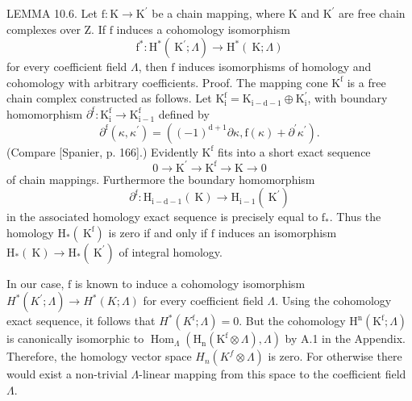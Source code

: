 \documentclass[10pt]{article}
\begin{document}
LEMMA 10.6. Let $\mathrm{f}: \mathrm{K} \rightarrow \mathrm{K}^{\prime}$ be a chain mapping, where $\mathrm{K}$ and $\mathrm{K}^{\prime}$ are free chain complexes over Z. If $\mathrm{f}$ induces a cohomology isomorphism
$$
\mathrm{f}^{*}: \mathrm{H}^{*}\left(\mathrm{~K}^{\prime} ; \Lambda\right) \rightarrow \mathrm{H}^{*}(\mathrm{~K} ; \Lambda)
$$
for every coefficient field $\Lambda$, then $\mathrm{f}$ induces isomorphisms of homology and cohomology with arbitrary coefficients. Proof. The mapping cone $\mathrm{K}^{\mathrm{f}}$ is a free chain complex constructed as follows. Let $\mathrm{K}_{\mathrm{i}}^{\mathrm{f}}=\mathrm{K}_{\mathrm{i}-\mathrm{d}-1} \oplus \mathrm{K}_{\mathrm{i}}^{\prime}$, with boundary homomorphism $\partial^{\mathrm{f}}: \mathrm{K}_{\mathrm{i}}^{\mathrm{f}} \rightarrow \mathrm{K}_{\mathrm{i}-1}^{\mathrm{f}}$ defined by
$$
\partial^{\mathrm{f}}\left(\kappa, \kappa^{\prime}\right)=\left((-1)^{\mathrm{d}+1} \partial \kappa, \mathrm{f}(\kappa)+\partial^{\prime} \kappa^{\prime}\right) .
$$
(Compare [Spanier, p. 166].) Evidently $\mathrm{K}^{\mathrm{f}}$ fits into a short exact sequence
$$
0 \rightarrow \mathrm{K}^{\prime} \rightarrow \mathrm{K}^{\mathrm{f}} \rightarrow \mathrm{K} \rightarrow 0
$$
of chain mappings. Furthermore the boundary homomorphism
$$
\partial^{\mathrm{f}}: \mathrm{H}_{\mathrm{i}-\mathrm{d}-1}(\mathrm{~K}) \rightarrow \mathrm{H}_{\mathrm{i}-1}\left(\mathrm{~K}^{\prime}\right)
$$
in the associated homology exact sequence is precisely equal to $\mathrm{f}_{*}$. Thus the homology $\mathrm{H}_{*}\left(\mathrm{~K}^{\mathrm{f}}\right)$ is zero if and only if $\mathrm{f}$ induces an isomorphism $\mathrm{H}_{*}(\mathrm{~K}) \rightarrow \mathrm{H}_{*}\left(\mathrm{~K}^{\prime}\right)$ of integral homology.

In our case, $\mathrm{f}$ is known to induce a cohomology isomorphism $H^{*}\left(K^{\prime} ; \Lambda\right) \rightarrow H^{*}(K ; \Lambda)$ for every coefficient field $\Lambda$. Using the cohomology exact sequence, it follows that $H^{*}\left(K^{\mathrm{f}} ; \Lambda\right)=0$. But the cohomology $\mathrm{H}^{\mathrm{n}}\left(\mathrm{K}^{\mathrm{f}} ; \Lambda\right)$ is canonically isomorphic to $\operatorname{Hom}_{\Lambda}\left(\mathrm{H}_{\mathrm{n}}\left(\mathrm{K}^{\mathrm{f}} \otimes \Lambda\right), \Lambda\right)$ by A.1 in the Appendix. Therefore, the homology vector space $H_{n}\left(K^{f} \otimes \Lambda\right)$ is zero. For otherwise there would exist a non-trivial $\Lambda$-linear mapping from this space to the coefficient field $\Lambda$.
\end{document}
